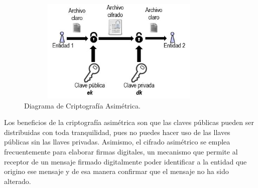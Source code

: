 \begin{figure}[H]
\centering
\includegraphics[width=10cm, height=5cm]{./images/Cripto_Asimetrica.JPG}
\caption{Diagrama de Criptografía Asimétrica.}
\label{fig:2-4-1}
\end{figure}

Los beneficios de la criptografía asimétrica son que las claves públicas pueden ser distribuidas con toda tranquilidad, pues no puedes hacer uso de las llaves públicas sin las llaves privadas. Asimismo, el cifrado asimétrico se emplea frecuentemente para elaborar firmas digitales, un mecanismo que permite al receptor de un mensaje firmado digitalmente poder identificar a la entidad que origino ese mensaje y de esa manera confirmar que el mensaje no ha sido alterado. \\



